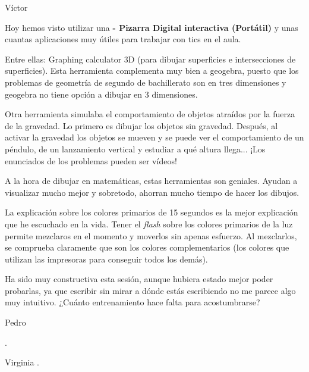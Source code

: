 \begin{opin}{\victorcolor}{Víctor}

Hoy hemos visto utilizar una \textbf{ - Pizarra Digital interactiva (Portátil)} y unas cuantas aplicaciones muy útiles para trabajar con tics en el aula.

Entre ellas: Graphing calculator 3D (para dibujar superficies e intersecciones de superficies).
%
Esta herramienta complementa muy bien a geogebra, puesto que los problemas de geometría de segundo de bachillerato son en tres dimensiones y geogebra no tiene opción a dibujar en 3 dimensiones.

Otra herramienta simulaba el comportamiento de objetos atraídos por la fuerza de la gravedad. 
%
Lo primero es dibujar los objetos sin gravedad. Después, al activar la gravedad los objetos se mueven y se puede ver el comportamiento de un péndulo, de un lanzamiento vertical y estudiar a qué altura llega... ¡Los enunciados de los problemas pueden ser vídeos!

A la hora de dibujar en matemáticas, estas herramientas son geniales. Ayudan a visualizar mucho mejor y sobretodo, ahorran mucho tiempo de hacer los dibujos.

La explicación sobre los colores primarios de 15 segundos es la mejor explicación que he escuchado en la vida. 
%
Tener el \textit{flash} sobre los colores primarios de la luz permite mezclaros en el momento y moverlos sin apenas esfuerzo. 
%
Al mezclarlos, se comprueba claramente que son los colores complementarios (los colores que utilizan las impresoras para conseguir todos los demás).

Ha sido muy constructiva esta sesión, aunque hubiera estado mejor poder probarlas, ya que escribir sin mirar a dónde estás escribiendo no me parece algo muy intuitivo. 
%
¿Cuánto entrenamiento hace falta para acostumbrarse?


\end{opin}

\begin{opin}{\pedrocolor}{Pedro}

.


\end{opin}

\begin{opin}{\virgicolor}{Virginia}
.


\end{opin}
